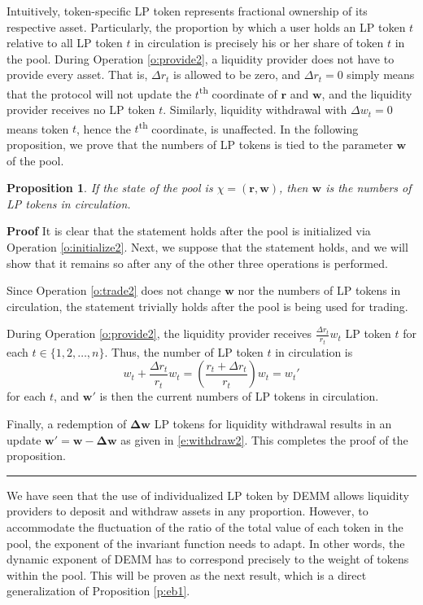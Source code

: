 \documentclass[12pt,a4paper]{article}
\newtheorem{proposition}[corollary]{Proposition}
\newcommand{\qed}{\rule{.07in}{.1in}}
\newenvironment{proof}{\vspace{1ex}\noindent\textbf{Proof}\hspace{0.5em}}{\hfill\qed\vspace{1ex}}
\begin{document}
Intuitively, token-specific LP token represents fractional ownership of its respective asset. Particularly, the proportion by which a user holds an LP token $t$ relative to all LP token $t$ in circulation is precisely his or her share of token $t$ in the pool. During Operation \ref{o:provide2}, a liquidity provider does not have to provide every asset. That is, $\Delta r_t$ is allowed to be zero, and $\Delta r_t=0$ simply means that the protocol will not update the $t$\textsuperscript{th} coordinate of $\mathbf{r}$ and $\mathbf{w}$, and the liquidity provider receives no LP token $t$. Similarly, liquidity withdrawal with $\Delta w_t=0$ means token $t$, hence the $t$\textsuperscript{th} coordinate, is unaffected. In the following proposition, we prove that the numbers of LP tokens is tied to the parameter $\mathbf{w}$ of the pool.

\begin{proposition}
If the state of the pool is $\chi=(\mathbf{r},\mathbf{w})$, then $\mathbf{w}$ is the numbers of LP tokens in circulation.
\end{proposition}

\begin{proof}
It is clear that the statement holds after the pool is initialized via Operation \ref{o:initialize2}. Next, we suppose that the statement holds, and we will show that it remains so after any of the other three operations is performed.

Since Operation \ref{o:trade2} does not change $\mathbf{w}$ nor the numbers of LP tokens in circulation, the statement trivially holds after the pool is being used for trading.

During Operation \ref{o:provide2}, the liquidity provider receives $\frac{\Delta r_t}{r_t}w_t$ LP token $t$ for each $t\in\{1,2,\ldots,n\}$. Thus, the number of LP token $t$ in circulation is
\[w_t+\frac{\Delta r_t}{r_t}w_t=\left(\frac{r_t+\Delta r_t}{r_t}\right)w_t=w_t'\]
for each $t$, and $\mathbf{w'}$ is then the current numbers of LP tokens in circulation.

Finally, a redemption of $\mathbf{\Delta w}$ LP tokens for liquidity withdrawal results in an update $\mathbf{w'}=\mathbf{w}-\mathbf{\Delta w}$ as given in \eqref{e:withdraw2}. This completes the proof of the proposition.
\end{proof}

We have seen that the use of individualized LP token by DEMM allows liquidity providers to deposit and withdraw assets in any proportion. However, to accommodate the fluctuation of the ratio of the total value of each token in the pool, the exponent of the invariant function needs to adapt. In other words, the dynamic exponent of DEMM has to correspond precisely to the weight of tokens within the pool. This will be proven as the next result, which is a direct generalization of Proposition \ref{p:eb1}.
\end{document}
